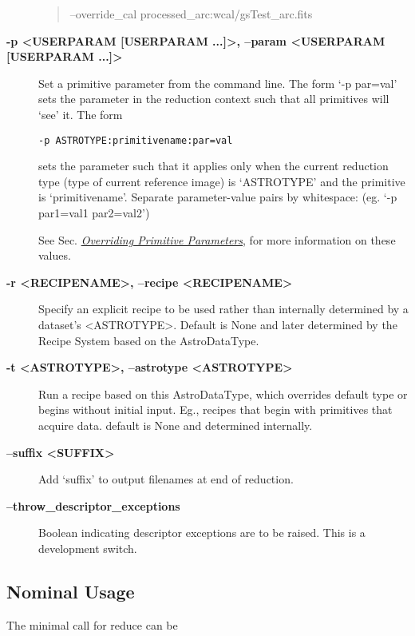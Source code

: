 \documentclass[letterpaper,10pt,english]{sphinxmanual}
\begin{document}
\begin{description}
\begin{quote}
--override\_cal processed\_arc:wcal/gsTest\_arc.fits
\end{quote}

\item[{\textbf{-p \textless{}USERPARAM {[}USERPARAM ...{]}\textgreater{}, --param \textless{}USERPARAM {[}USERPARAM ...{]}\textgreater{}}}] \leavevmode
Set a primitive parameter from the command line. The form `-p par=val' sets
the parameter in the reduction context such that all primitives will `see' it.
The form

\begin{Verbatim}[commandchars=\\\{\}]
-p ASTROTYPE:primitivename:par=val
\end{Verbatim}

sets the parameter such that it applies only when the current reduction type
(type of current reference image) is `ASTROTYPE' and the primitive is
`primitivename'. Separate parameter-value pairs by whitespace:
(eg. `-p par1=val1 par2=val2')

See Sec. {\hyperref[interfaces:userpars]{\emph{Overriding Primitive Parameters}}}, for more information on these values.

\item[{\textbf{-r \textless{}RECIPENAME\textgreater{}, --recipe \textless{}RECIPENAME\textgreater{}}}] \leavevmode
Specify an explicit recipe to be used rather than internally determined by
a dataset's \textless{}ASTROTYPE\textgreater{}. Default is None and later determined by the Recipe
System based on the AstroDataType.

\item[{\textbf{-t \textless{}ASTROTYPE\textgreater{}, --astrotype \textless{}ASTROTYPE\textgreater{}}}] \leavevmode
Run a recipe based on this AstroDataType, which overrides default type or
begins without initial input. Eg., recipes that begin with primitives that
acquire data.  default is None and determined internally.

\item[{\textbf{--suffix \textless{}SUFFIX\textgreater{}}}] \leavevmode
Add `suffix' to output filenames at end of reduction.

\item[{\textbf{--throw\_descriptor\_exceptions}}] \leavevmode
Boolean indicating descriptor exceptions are to be raised. This is a
development switch.

\end{description}


\subsection{Nominal Usage}
\label{interfaces:nominal-usage}
The minimal call for reduce can be
\end{document}
